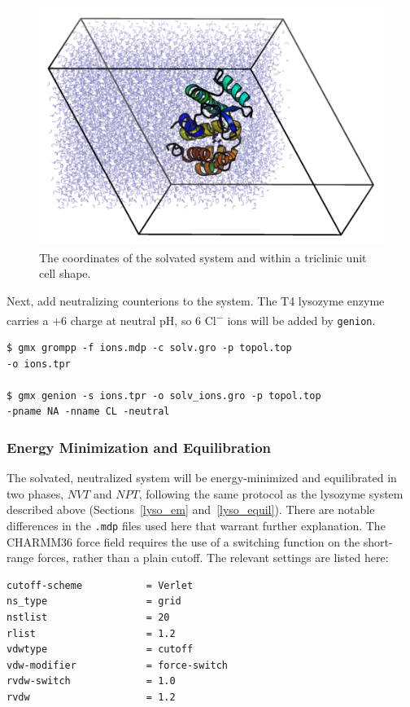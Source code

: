 \documentclass[9pt,tutorial]{livecoms}
\begin{document}
\begin{figure}[h!]
\centering
\includegraphics{3htb_unit_cell}
\caption{The coordinates of the solvated system and within a triclinic unit cell shape.}
\label{3htb_unit_cell_fig}
\end{figure}

Next, add neutralizing counterions to the system. The T4 lysozyme enzyme carries a +6 charge at neutral pH, so 6 Cl\textsuperscript{$-$} ions will be added by \texttt{genion}.

\begin{verbatim}
$ gmx grompp -f ions.mdp -c solv.gro -p topol.top
-o ions.tpr

$ gmx genion -s ions.tpr -o solv_ions.gro -p topol.top
-pname NA -nname CL -neutral
\end{verbatim}

\subsubsection{Energy Minimization and Equilibration} \label{complex_em_eq}

The solvated, neutralized system will be energy-minimized and equilibrated in two phases, $NVT$ and $NPT$, following the same protocol as the lysozyme system described above (Sections~\ref{lyso_em} and~\ref{lyso_equil}). There are notable differences in the \texttt{.mdp} files used here that warrant further explanation. The CHARMM36 force field requires the use of a switching function on the short-range forces, rather than a plain cutoff. The relevant settings are listed here:

\begin{verbatim}
cutoff-scheme           = Verlet
ns_type                 = grid
nstlist                 = 20
rlist                   = 1.2
vdwtype                 = cutoff
vdw-modifier            = force-switch
rvdw-switch             = 1.0
rvdw                    = 1.2
\end{verbatim}
\end{document}
